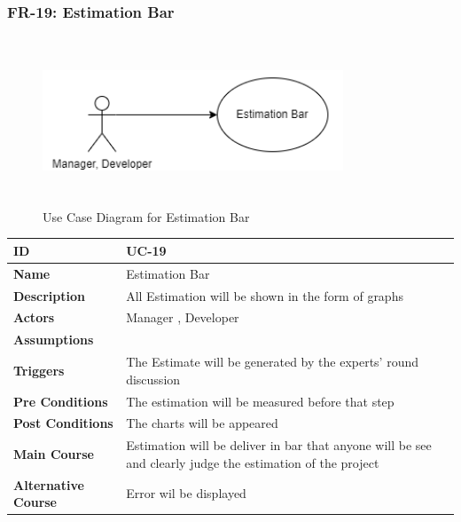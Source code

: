     \newpage

    \subsubsection{FR-19: Estimation Bar}
    \begin{figure}[H]
        \includegraphics[height=5cm, width=0.8\textwidth]{./diagrams/Use Case/u19.png}
        \centering 
        \caption{Use Case Diagram for Estimation Bar}
        \label{fig:Usecase1}
        \end{figure}
        
    \begin{center}
        \begin{tabularx}{\textwidth}{|l|X|}
            \hline
            \textbf{ID} & UC-19 \\
            \hline
            \textbf{Name} & Estimation Bar \\
            \hline
            \textbf{Description} & All Estimation will be shown in the form of graphs \\
            \hline
            \textbf{Actors} & Manager , Developer \\
            \hline
            \textbf{Assumptions} &  \\
            \hline
            \textbf{Triggers} & The Estimate will be generated by the experts' round discussion \\
            \hline
            \textbf{Pre Conditions} & The estimation will be measured before that step  \\
            \hline
            \textbf{Post Conditions} & The charts will be appeared \\
            \hline
            \textbf{Main Course} & Estimation will be deliver in bar that anyone will be see and clearly judge the estimation of the project \\
            \hline
            \textbf{Alternative Course} & Error wil be displayed \\
            \hline
            
        \end{tabularx}
    \end{center}
    \newpage
    

  